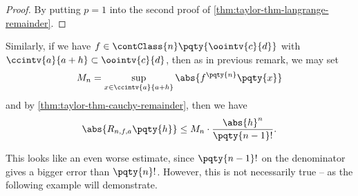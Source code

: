 \begin{proof}
    By putting \(p = 1\) into the second proof of \autoref{thm:taylor-thm-langrange-remainder}.
\end{proof}

\begin{remark}
    Similarly, if we have \(f \in \contClass{n} \pqty{\oointv{c}{d}}\) with \(\ccintv{a}{a + h} \subset \oointv{c}{d}\), then as in previous remark, we may set
    \[
        M_n = \sup_{x \in \ccintv{a}{a + h}} \abs{f^{\pqty{n}} \pqty{x}}
    \]
    and by \autoref{thm:taylor-thm-cauchy-remainder}, then we have
    \[
        \abs{R_{n, f, a} \pqty{h}} \leq M_n \cdot \frac{\abs{h}^n}{\pqty{n - 1}!}.
    \]
\end{remark}

This looks like an even worse estimate, since \(\pqty{n - 1}!\) on the denominator gives a bigger error than \(\pqty{n}!\). However, this is not necessarily true -- as the following example will demonstrate.

